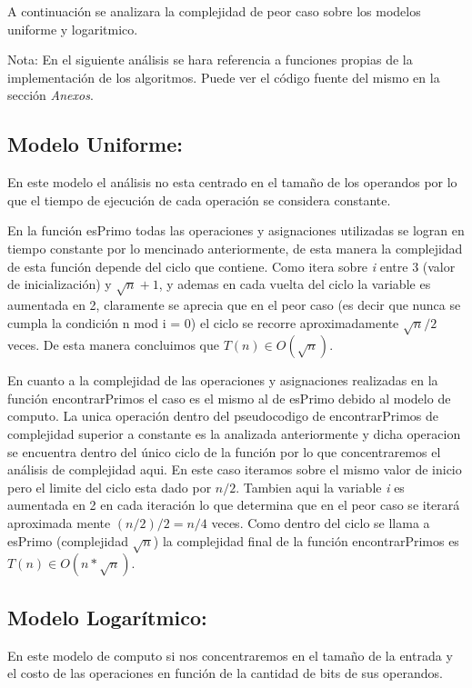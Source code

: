 \documentclass[a4paper,10pt] {article}
\begin{document}
A continuaci\'on se analizara la complejidad de peor caso sobre los modelos
uniforme y logaritmico. 

Nota: En el siguiente an\'alisis se hara referencia a funciones propias de la implementaci\'on de los algoritmos. Puede ver el c\'odigo fuente del mismo en la secci\'on \textit{Anexos}.

\subsection*{Modelo Uniforme:}

En este modelo el an\'alisis no esta centrado en el tama\~{n}o de los operandos
por lo que el tiempo de ejecuci\'on de cada operaci\'on se considera constante.

En la funci\'on esPrimo todas las operaciones y asignaciones utilizadas se
logran en tiempo constante por lo mencinado anteriormente, de esta manera la
complejidad de esta funci\'on depende del ciclo que contiene. Como itera sobre
\textit{i} entre 3 (valor de inicializaci\'on) y $\sqrt{n}+1$, y ademas en cada
vuelta del ciclo la variable es aumentada en 2, claramente se aprecia que en el
peor caso (es decir que nunca se cumpla la condici\'on n mod i = 0) el ciclo se
recorre aproximadamente $\sqrt{n}/2$ veces. De esta manera concluimos que $T(n)
\in O(\sqrt{n})$.

En cuanto a la complejidad de las operaciones y asignaciones realizadas en la
funci\'on encontrarPrimos el caso es el mismo al de esPrimo debido al modelo de
computo. La unica operaci\'on dentro del pseudocodigo de encontrarPrimos de
complejidad superior a constante es la analizada anteriormente y dicha operacion se
encuentra dentro del \'unico ciclo de la funci\'on por lo que concentraremos el
an\'alisis de complejidad aqui. En este caso iteramos sobre el mismo valor de
inicio pero el limite del ciclo esta dado por $n/2$. Tambien aqui la variable
\textit{i} es aumentada en 2 en cada iteraci\'on lo que determina que en el peor
caso se iterar\'a aproximada mente $(n/2)/2 = n/4$ veces. Como dentro del ciclo
se llama a esPrimo (complejidad $\sqrt{n}$) la complejidad final de la funci\'on
encontrarPrimos es $T(n) \in O(n*\sqrt{n})$.

\subsection*{Modelo Logar\'itmico:}

En este modelo de computo si nos concentraremos en el tama\~{n}o de la entrada y
el costo de las operaciones en funci\'on de la cantidad de bits de sus
operandos.
\end{document}
